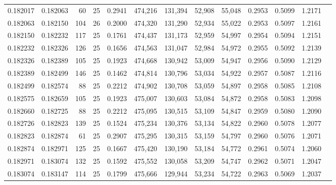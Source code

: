 \begin{tabular}{rrrrrrrrrrrrr}
0.182017 & 0.182063 &    60 &  25 &                                     0.2941 & 474,216 & 131,394 &  52,908 &  55,048 & 0.2953 & 0.5099 & 1.2171 \\
0.182063 & 0.182150 &   104 &  26 &                                     0.2000 & 474,320 & 131,290 &  52,934 &  55,022 & 0.2953 & 0.5097 & 1.2161 \\
0.182150 & 0.182232 &   117 &  25 &                                     0.1761 & 474,437 & 131,173 &  52,959 &  54,997 & 0.2954 & 0.5094 & 1.2151 \\
0.182232 & 0.182326 &   126 &  25 &                                     0.1656 & 474,563 & 131,047 &  52,984 &  54,972 & 0.2955 & 0.5092 & 1.2139 \\
0.182326 & 0.182389 &   105 &  25 &                                     0.1923 & 474,668 & 130,942 &  53,009 &  54,947 & 0.2956 & 0.5090 & 1.2129 \\
0.182389 & 0.182499 &   146 &  25 &                                     0.1462 & 474,814 & 130,796 &  53,034 &  54,922 & 0.2957 & 0.5087 & 1.2116 \\
0.182499 & 0.182574 &    88 &  25 &                                     0.2212 & 474,902 & 130,708 &  53,059 &  54,897 & 0.2958 & 0.5085 & 1.2108 \\
0.182575 & 0.182659 &   105 &  25 &                                     0.1923 & 475,007 & 130,603 &  53,084 &  54,872 & 0.2958 & 0.5083 & 1.2098 \\
0.182660 & 0.182725 &    88 &  25 &                                     0.2212 & 475,095 & 130,515 &  53,109 &  54,847 & 0.2959 & 0.5080 & 1.2090 \\
0.182726 & 0.182823 &   139 &  25 &                                     0.1524 & 475,234 & 130,376 &  53,134 &  54,822 & 0.2960 & 0.5078 & 1.2077 \\
0.182823 & 0.182874 &    61 &  25 &                                     0.2907 & 475,295 & 130,315 &  53,159 &  54,797 & 0.2960 & 0.5076 & 1.2071 \\
0.182874 & 0.182971 &   125 &  25 &                                     0.1667 & 475,420 & 130,190 &  53,184 &  54,772 & 0.2961 & 0.5074 & 1.2060 \\
0.182971 & 0.183074 &   132 &  25 &                                     0.1592 & 475,552 & 130,058 &  53,209 &  54,747 & 0.2962 & 0.5071 & 1.2047 \\
0.183074 & 0.183147 &   114 &  25 &                                     0.1799 & 475,666 & 129,944 &  53,234 &  54,722 & 0.2963 & 0.5069 & 1.2037 \\

\end{tabular}
